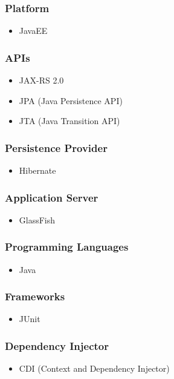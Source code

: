 	\subsubsection{Platform}
	\begin{itemize}
	\item JavaEE
	\end{itemize}
	\subsubsection{APIs}
	\begin{itemize}
	\item JAX-RS 2.0
	\item JPA (Java Persistence API)
	\item JTA (Java Transition API)
	\end{itemize}
	\subsubsection{Persistence Provider}
	\begin{itemize}
	\item Hibernate
	\end{itemize}
	\subsubsection{Application Server}
	\begin{itemize}
	\item GlassFish 
	\end{itemize}
	\subsubsection{Programming Languages}
	\begin{itemize}
	\item Java
	\end{itemize}
	\subsubsection{Frameworks}
	\begin{itemize}
	\item JUnit
	\end{itemize}
	\subsubsection{Dependency Injector}
	\begin{itemize}
	\item CDI (Context and Dependency Injector)
	\end{itemize}
